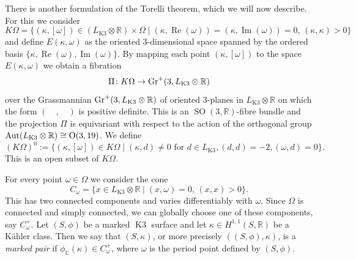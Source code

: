 \documentclass[a4paper,11pt]{article}
\newcommand{\CC}{\mathbb C}
\newcommand{\RR}{\mathbb R}
\newcommand{\SO}{\mathop{\mathrm {SO}}\nolimits}
\newcommand{\Orth}{\mathop{\null\mathrm {O}}\nolimits}
\newcommand{\re}{\mathop{\mathrm {Re}}\nolimits}
\newcommand{\im}{\mathop{\mathrm {Im}}\nolimits}
\newcommand{\Aut}{\mathop{\mathrm {Aut}}\nolimits}
\newcommand{\Gr}{\mathop{\null\mathrm {Gr}}\nolimits}
\newcommand{\Kthree}{\mathop{\mathrm {K3}}\nolimits}
\begin{document}
There is another formulation of the Torelli theorem, which we will now
describe.  For this we consider
\begin{equation*}
K\Omega=\{ (\kappa,[\omega]) \in (L_{\Kthree} \otimes\RR) \times
\Omega \mid (\kappa,\re(\omega))=(\kappa,\im(\omega))=0, \,
(\kappa,\kappa) > 0 \}
\end{equation*}
and define $E(\kappa,\omega)$ as the oriented $3$-dimensional space
spanned by the ordered basis $\{\kappa, \re(\omega),\im(\omega)\}$.
By mapping each point $(\kappa,[\omega])$ to the space
$E(\kappa,\omega)$ we obtain a fibration
\begin{equation*}
\Pi\colon  K\Omega \to \Gr^+(3,L_{\Kthree} \otimes\RR)
\end{equation*}
over the Grassmannian $\Gr^+(3,L_{\Kthree} \otimes\RR)$ of oriented
$3$-planes in $L_{\Kthree} \otimes\RR $ on which the form
$(\quad,\quad)$ is positive definite. This is an $\SO(3,\RR)$-fibre
bundle and the projection $\Pi$ is equivariant with respect to the
action of the orthogonal group $\Aut(L_{\Kthree} \otimes\RR )\cong
\Orth(3,19)$. We define
\begin{equation*}
(K\Omega)^0:=\{(\kappa,[\omega]) \in K\Omega \mid (\kappa,d) \neq 0 \mbox{ for } d \in L_{\Kthree},
(d,d)=-2, (\omega,d)=0 \}.
\end{equation*}
This is an open subset of $K\Omega$.

For every point $\omega \in \Omega$ we consider the cone
\begin{equation*}
C_{\omega} =\{x \in L_{\Kthree} \otimes\RR \mid (x,\omega)=0, \, (x,x)>0 \}.
\end{equation*}
This has two connected components and varies differentiably with
$\omega$. Since $\Omega$ is connected and simply connected, we can
globally choose one of these components, say $C_{\omega}^+$. Let
$(S,\phi)$ be a marked $\Kthree$ surface and let $\kappa \in
H^{1,1}(S,\RR)$ be a K\"ahler class. Then we say that $(S,\kappa)$, or
more precisely $((S,\phi),\kappa)$, is a \emph{marked pair} if
$\phi_{\CC}(\kappa) \in C_{\omega}^+$, where $\omega$ is the period
point defined by $(S,\phi)$.
\end{document}
